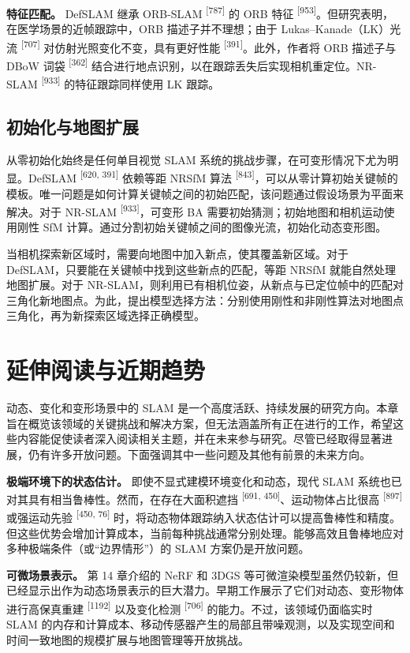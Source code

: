 \textbf{特征匹配。} DefSLAM 继承 ORB-SLAM \textsuperscript{[787]} 的 ORB 特征 \textsuperscript{[953]}。但研究表明，在医学场景的近帧跟踪中，ORB 描述子并不理想；由于 Lukas--Kanade（LK）光流 \textsuperscript{[707]} 对仿射光照变化不变，具有更好性能 \textsuperscript{[391]}。此外，作者将 ORB 描述子与 DBoW 词袋 \textsuperscript{[362]} 结合进行地点识别，以在跟踪丢失后实现相机重定位。NR-SLAM \textsuperscript{[933]} 的特征跟踪同样使用 LK 跟踪。

\subsection{初始化与地图扩展}

从零初始化始终是任何单目视觉 SLAM 系统的挑战步骤，在可变形情况下尤为明显。DefSLAM \textsuperscript{[620, 391]} 依赖等距 NRSfM 算法 \textsuperscript{[843]}，可以从零计算初始关键帧的模板。唯一问题是如何计算关键帧之间的初始匹配，该问题通过假设场景为平面来解决。对于 NR-SLAM \textsuperscript{[933]}，可变形 BA 需要初始猜测；初始地图和相机运动使用刚性 SfM 计算。通过分割初始关键帧之间的图像光流，初始化动态变形图。

当相机探索新区域时，需要向地图中加入新点，使其覆盖新区域。对于 DefSLAM，只要能在关键帧中找到这些新点的匹配，等距 NRSfM 就能自然处理地图扩展。对于 NR-SLAM，则利用已有相机位姿，从新点与已定位帧中的匹配对三角化新地图点。为此，提出模型选择方法：分别使用刚性和非刚性算法对地图点三角化，再为新探索区域选择正确模型。

\section{延伸阅读与近期趋势}

动态、变化和变形场景中的 SLAM 是一个高度活跃、持续发展的研究方向。本章旨在概览该领域的关键挑战和解决方案，但无法涵盖所有正在进行的工作，希望这些内容能促使读者深入阅读相关主题，并在未来参与研究。尽管已经取得显著进展，仍有许多开放问题。下面强调其中一些问题及其他有前景的未来方向。

\textbf{极端环境下的状态估计。} 即使不显式建模环境变化和动态，现代 SLAM 系统也已对其具有相当鲁棒性。然而，在存在大面积遮挡 \textsuperscript{[691, 450]}、运动物体占比很高 \textsuperscript{[897]} 或强运动先验 \textsuperscript{[450, 76]} 时，将动态物体跟踪纳入状态估计可以提高鲁棒性和精度。但这些优势会增加计算成本，当前每种挑战通常分别处理。能够高效且鲁棒地应对多种极端条件（或“边界情形”）的 SLAM 方案仍是开放问题。

\textbf{可微场景表示。} 第 14 章介绍的 NeRF 和 3DGS 等可微渲染模型虽然仍较新，但已经显示出作为动态场景表示的巨大潜力。早期工作展示了它们对动态、变形物体进行高保真重建 \textsuperscript{[1192]} 以及变化检测 \textsuperscript{[706]} 的能力。不过，该领域仍面临实时 SLAM 的内存和计算成本、移动传感器产生的局部且带噪观测，以及实现空间和时间一致地图的规模扩展与地图管理等开放挑战。

